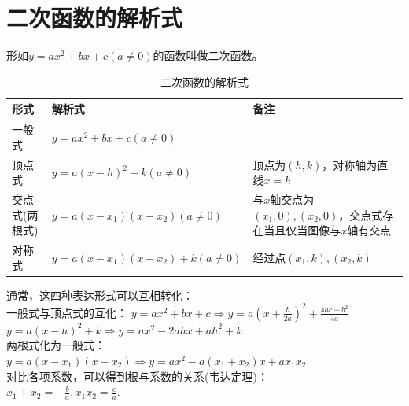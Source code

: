 \section{二次函数的解析式}
\begin{theorem}
    形如$y=ax^2+bx+c(a\ne 0)$的函数叫做二次函数。
\end{theorem}
\begin{table}[H]
    \centering
    \caption{二次函数的解析式}
    \begin{tabular}{l|l|p{7cm}}
        \hline
        \hline
        形式       & 解析式                             & 备注                                            \\
        \hline
        一般式      & $y=ax^2+bx+c(a\ne 0)$           &                                               \\
        \hline
        顶点式      & $y=a(x-h)^2+k(a \ne 0)$         & 顶点为$(h,k)$，对称轴为直线$x=h$                        \\
        \hline
        交点式(两根式) & $y=a(x-x_1)(x-x_2)(a \ne 0)$    & 与$x$轴交点为$(x_1,0),(x_2,0)$，交点式存在当且仅当图像与$x$轴有交点 \\
        \hline
        对称式      & $y=a(x-x_1)(x-x_2)+k (a \ne 0)$ & 经过点$(x_1,k),(x_2,k)$                          \\
        \hline
        \hline
    \end{tabular}
\end{table}
\begin{theorem}
    通常，这四种表达形式可以互相转化：\\
    一般式与顶点式的互化：
    $y=ax^2+bx+c \Rightarrow y=a(x+\frac{b}{2a})^2+\frac{4ac-b^2}{4a}$ \\
    $y=a(x-h)^2+k \Rightarrow y=ax^2-2ahx+ah^2+k$ \\
    两根式化为一般式：\\
    $y=a(x-x_1)(x-x_2) \Rightarrow y=ax^2-a(x_1+x_2)x+ax_1x_2$ \\
    对比各项系数，可以得到根与系数的关系(韦达定理)：\\
    $x_1+x_2=-\frac{b}{a},x_1x_2=\frac{c}{a}$.
\end{theorem}
\clearpage

